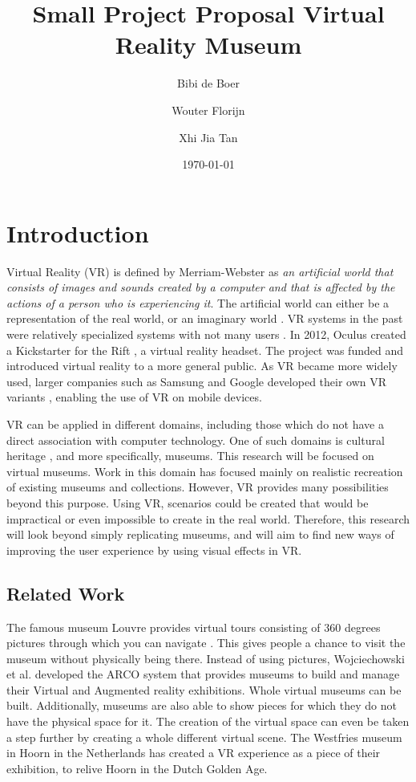 \documentclass[a4paper]{article}
\title{Small Project Proposal Virtual Reality Museum}
\author{Bibi de Boer \and Wouter Florijn \and Xhi Jia Tan}
\date{\today}
\begin{document}
\maketitle

\section{Introduction}

Virtual Reality (VR) is defined by Merriam-Webster \cite{merriam} as \emph{an artificial world that consists of images and sounds created by a computer and that is affected by the actions of a person who is experiencing it}. The artificial world can either be a representation of the real world, or an imaginary world \cite{martens}. VR systems in the past were relatively specialized systems with not many users \cite{martens}. In 2012, Oculus created a Kickstarter\cite{kickstarter} for the Rift \cite{oculus}, a virtual reality headset. The project was funded and  introduced virtual reality to a more general public. As VR became more widely used, larger companies such as Samsung and Google developed their own VR variants \cite{gearvr, cardboard}, enabling the use of VR on mobile devices. 

VR can be applied in different domains, including those which do not have a direct association with computer technology. One of such domains is cultural heritage \cite{wojciechowski}, and more specifically, museums. This research will be focused on virtual museums. Work in this domain has focused mainly on realistic recreation of existing museums and collections. However, VR provides many possibilities beyond this purpose. Using VR, scenarios could be created that would be impractical or even impossible to create in the real world. Therefore, this research will look beyond simply replicating museums, and will aim to find new ways of improving the user experience by using visual effects in VR.


\subsection{Related Work}
The famous museum Louvre provides virtual tours consisting of 360 degrees pictures through which you can navigate \cite{louvre}. This gives people a chance to visit the museum without physically being there. Instead of using pictures, Wojciechowski et al. \cite{wojciechowski} developed the ARCO system that provides museums to build and manage their Virtual and Augmented reality exhibitions. Whole virtual museums can be built. Additionally, museums are also able to show pieces for which they do not have the physical space for it. The creation of the virtual space can even be taken a step further by creating a whole different virtual scene. The Westfries museum in Hoorn in the Netherlands has created a VR experience \cite{westfries} as a piece of their exhibition, to relive Hoorn in the Dutch Golden Age.
\end{document}
